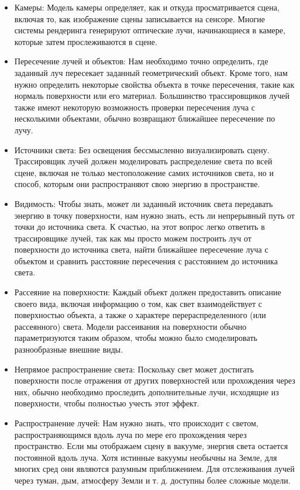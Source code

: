 \begin{itemize}
    \item Камеры: Модель камеры определяет, как и откуда просматривается сцена, включая то, как 
        изображение сцены записывается на сенсоре. Многие системы рендеринга генерируют оптические 
        лучи, начинающиеся в камере, которые затем прослеживаются в сцене.

    \item Пересечение лучей и объектов: Нам необходимо точно определить, где заданный луч пересекает 
        заданный геометрический объект. Кроме того, нам нужно определить некоторые свойства объекта 
        в точке пересечения, такие как нормаль поверхности или его материал. Большинство 
        трассировщиков лучей также имеют некоторую возможность проверки пересечения луча с 
        несколькими объектами, обычно возвращают ближайшее пересечение по лучу.

    \item Источники света: Без освещения бессмысленно визуализировать сцену. Трассировщик лучей 
        должен моделировать распределение света по всей сцене, включая не только местоположение 
        самих источников света, но и способ, которым они распространяют свою энергию в пространстве.

    \item Видимость: Чтобы знать, может ли заданный источник света передавать энергию в точку 
        поверхности, нам нужно знать, есть ли непрерывный путь от точки до источника света. 
        К счастью, на этот вопрос легко ответить в трассировщике лучей, так как мы просто 
        можем построить луч от поверхности до источника света, найти ближайшее пересечение луча
        с объектом и сравнить расстояние пересечения с расстоянием до источника света.

    \item Рассеяние на поверхности: Каждый объект должен предоставить описание своего вида, 
        включая информацию о том, как свет взаимодействует с поверхностью объекта, а также о
        характере перераспределенного (или рассеянного) света. Модели рассеивания на поверхности 
        обычно параметризуются таким образом, чтобы можно было смоделировать разнообразные внешние виды.

    \item Непрямое распространение света: Поскольку свет может достигать поверхности после отражения 
        от других поверхностей или прохождения через них, обычно необходимо проследить дополнительные 
        лучи, исходящие из поверхности, чтобы полностью учесть этот эффект.

    \item Распространение лучей: Нам нужно знать, что происходит с светом, распространяющимся вдоль 
        луча по мере его прохождения через пространство. Если мы отображаем сцену в вакууме, 
        энергия света остается постоянной вдоль луча. Хотя истинные вакуумы необычны на Земле, 
        для многих сред они являются разумным приближением. Для отслеживания лучей через туман, 
        дым, атмосферу Земли и т. д. доступны более сложные модели.
\end{itemize}~\cite{PBRT3e}

